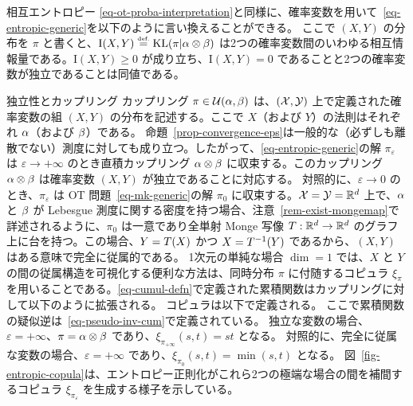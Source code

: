 \begin{rem2}{相互エントロピー}
\eqref{eq-ot-proba-interpretation}と同様に、確率変数を用いて~\eqref{eq-entropic-generic}を以下のように言い換えることができる。
ここで $(X,Y)$ の分布を $\pi$ と書くと、$\text{I}(X,Y) \stackrel{\mbox{\upshape\tiny def.}}{=} \operatorname{KL}(\pi|\alpha\otimes\beta)$ は2つの確率変数間のいわゆる相互情報量である。$\text{I}(X,Y) \geq 0$ が成り立ち、$\text{I}(X,Y)=0$ であることと2つの確率変数が独立であることは同値である。
\end{rem2}

\begin{rem2}{独立性とカップリング}
	カップリング $\pi \in \mathcal{U}(\alpha,\beta)$ は、$(\mathcal{X},\mathcal{Y})$ 上で定義された確率変数の組 $(X,Y)$ の分布を記述する。ここで $X$（および $Y$）の法則はそれぞれ $\alpha$（および $\beta$）である。
	命題~\ref{prop-convergence-eps}は一般的な（必ずしも離散でない）測度に対しても成り立つ。したがって、\eqref{eq-entropic-generic}の解 $\pi_\varepsilon$ は $\varepsilon \rightarrow+\infty$ のとき直積カップリング $\alpha \otimes \beta$ に収束する。このカップリング $\alpha \otimes \beta$ は確率変数 $(X,Y)$ が独立であることに対応する。
	対照的に、$\varepsilon \rightarrow 0$ のとき、$\pi_\varepsilon$ は OT 問題~\eqref{eq-mk-generic}の解 $\pi_0$ に収束する。$\mathcal{X}=\mathcal{Y}=\mathbb{R}^d$ 上で、$\alpha$ と $\beta$ が Lebesgue 測度に関する密度を持つ場合、注意~\ref{rem-exist-mongemap}で詳述されるように、$\pi_0$ は一意であり全単射 Monge 写像 $T : \mathbb{R}^d \rightarrow \mathbb{R}^d$ のグラフ上に台を持つ。この場合、$Y=T(X)$ かつ $X=T^{-1}(Y)$ であるから、$(X,Y)$ はある意味で完全に従属的である。
	1次元の単純な場合 $\dim=1$ では、$X$ と $Y$ の間の従属構造を可視化する便利な方法は、同時分布 $\pi$ に付随するコピュラ $\xi_\pi$ を用いることである。\eqref{eq-cumul-defn}で定義された累積関数はカップリングに対して以下のように拡張される。
	コピュラは以下で定義される。
	ここで累積関数の疑似逆は~\eqref{eq-pseudo-inv-cum}で定義されている。
	独立な変数の場合、$\varepsilon=+\infty$、\ie $\pi=\alpha\otimes \beta$ であり、$\xi_{\pi_{+\infty}}(s,t)=st$ となる。
	対照的に、完全に従属な変数の場合、$\varepsilon=+\infty$ であり、$\xi_{\pi_0}(s,t)=\min(s,t)$ となる。
	図~\ref{fig-entropic-copula}は、エントロピー正則化がこれら2つの極端な場合の間を補間するコピュラ $\xi_{\pi_\varepsilon}$ を生成する様子を示している。
\end{rem2}

